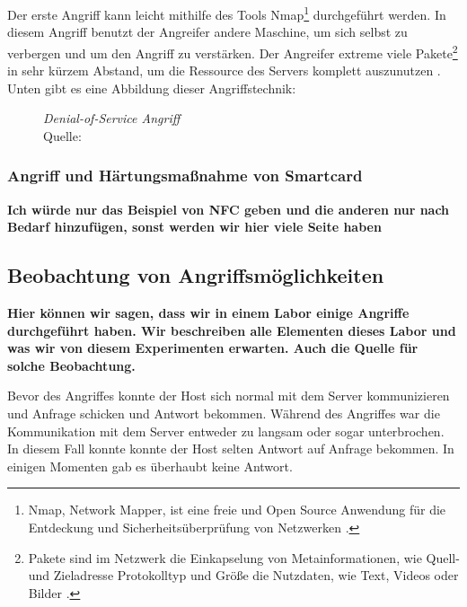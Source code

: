 Der erste Angriff kann leicht mithilfe des Tools Nmap\footnote{Nmap, Network Mapper, ist eine freie und Open Source Anwendung
für die Entdeckung und Sicherheitsüberprüfung von Netzwerken \cite{refst:nmap}.} durchgeführt werden. In diesem Angriff benutzt
der Angreifer andere Maschine, um sich selbst zu verbergen und um den Angriff zu verstärken. Der Angreifer extreme viele
Pakete\footnote{Pakete sind im Netzwerk die Einkapselung von Metainformationen, wie Quell- und Zieladresse Protokolltyp 
und Größe die Nutzdaten, wie Text, Videos oder Bilder \cite{refbook:SWIS}.} in sehr kürzem Abstand, um die Ressource des 
Servers komplett auszunutzen \cite{refip:KSDD}. Unten gibt es eine Abbildung dieser Angriffstechnik:

\begin{figure}[H]
  \caption{\textit{Denial-of-Service Angriff}\\ Quelle:\cite{refip:VDSD}}
  \label{fig:VDSD}
\end{figure}


\subsubsection{Angriff und Härtungsmaßnahme von Smartcard}
\textbf{Ich würde nur das Beispiel von NFC geben und die anderen nur nach Bedarf hinzufügen, sonst werden wir hier
viele Seite haben}


\subsection{Beobachtung von Angriffsmöglichkeiten}
\textbf{Hier können wir sagen, dass wir in einem Labor einige Angriffe durchgeführt haben. Wir beschreiben alle Elementen
dieses Labor und was wir von diesem Experimenten erwarten. Auch die Quelle für solche Beobachtung.}

Bevor des Angriffes konnte der Host sich normal mit dem Server kommunizieren und Anfrage schicken und Antwort bekommen.
Während des Angriffes war die Kommunikation mit dem Server entweder zu langsam oder sogar unterbrochen. In diesem Fall
konnte konnte der Host selten Antwort auf Anfrage bekommen. In einigen Momenten gab es überhaubt keine Antwort. 

